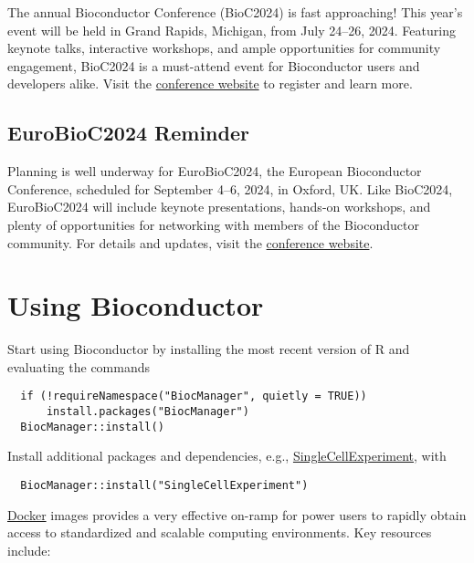 The annual Bioconductor Conference (BioC2024) is fast approaching! This year's event will be held in Grand Rapids, Michigan, from July 24--26, 2024. Featuring keynote talks, interactive workshops, and ample opportunities for community engagement, BioC2024 is a must-attend event for Bioconductor users and developers alike. Visit the \href{https://www.bioc2024.bioconductor.org/}{conference website} to register and learn more.

\subsection{EuroBioC2024 Reminder}\label{eurobioc2024-reminder}

Planning is well underway for EuroBioC2024, the European Bioconductor Conference, scheduled for September 4--6, 2024, in Oxford, UK. Like BioC2024, EuroBioC2024 will include keynote presentations, hands-on workshops, and plenty of opportunities for networking with members of the Bioconductor community. For details and updates, visit the \href{https://eurobioc2024.bioconductor.org/}{conference website}.

\section{Using Bioconductor}\label{using-bioconductor}

Start using
Bioconductor by installing the most recent version of R and evaluating
the commands

\begin{verbatim}
  if (!requireNamespace("BiocManager", quietly = TRUE))
      install.packages("BiocManager")
  BiocManager::install()
\end{verbatim}

Install additional packages and dependencies,
e.g., \href{https://bioconductor.org/packages/SingleCellExperiment}{SingleCellExperiment}, with

\begin{verbatim}
  BiocManager::install("SingleCellExperiment")
\end{verbatim}

\href{https://bioconductor.org/help/docker/}{Docker}
images provides a very effective on-ramp for power users to rapidly
obtain access to standardized and scalable computing environments.
Key resources include:

